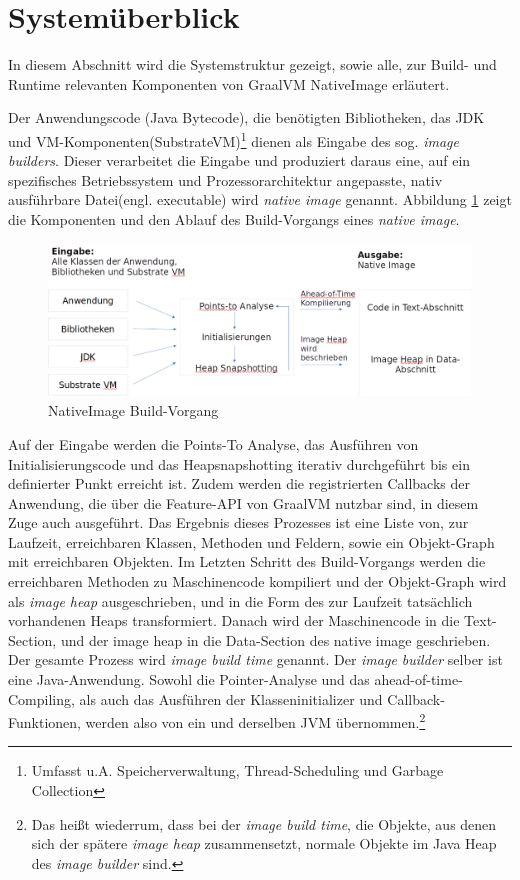 \section{Systemüberblick}
\label{sec:system}
In diesem Abschnitt wird die Systemstruktur gezeigt, sowie alle, zur Build- und Runtime relevanten Komponenten von GraalVM NativeImage erläutert.

Der Anwendungscode (Java Bytecode), die benötigten Bibliotheken, das JDK und VM-Komponenten(SubstrateVM)\footnote{Umfasst u.A. Speicherverwaltung, Thread-Scheduling und Garbage Collection} dienen als Eingabe des sog. \textit{image builders}. Dieser verarbeitet die Eingabe und produziert daraus eine, auf ein spezifisches Betriebssystem und Prozessorarchitektur angepasste, nativ ausführbare Datei(engl. executable) wird \textit{native image} genannt. 
Abbildung \ref{fig:system_buildtime} zeigt die Komponenten und den Ablauf des Build-Vorgangs eines \textit{native image}.

\begin{figure}[ht]
	\centering
	\includegraphics[width=1\textwidth]{resources/GraalVM_BuildTime.png}
	\caption{NativeImage Build-Vorgang}
	\label{fig:system_buildtime}
\end{figure}

Auf der Eingabe werden die Points-To Analyse, das Ausführen von Initialisierungscode und das Heapsnapshotting iterativ durchgeführt bis ein definierter Punkt erreicht ist. 
Zudem werden die registrierten Callbacks der Anwendung, die über die Feature-API von GraalVM nutzbar sind, in diesem Zuge auch ausgeführt. Das Ergebnis dieses Prozesses ist eine Liste von, zur Laufzeit, erreichbaren Klassen, 
Methoden und Feldern, sowie ein Objekt-Graph mit erreichbaren Objekten. Im Letzten Schritt des Build-Vorgangs werden die erreichbaren Methoden zu Maschinencode kompiliert
 und der Objekt-Graph wird als \textit{image heap} ausgeschrieben, und in die Form des zur Laufzeit tatsächlich vorhandenen Heaps transformiert. Danach wird der Maschinencode 
 in die Text-Section, und der image heap in die Data-Section \parencite[Fig. 1-13]{TISC1995} des native image geschrieben. Der gesamte Prozess wird \textit{image build time} genannt\parencite{Wimmer2019}.
Der \textit{image builder} selber ist eine Java-Anwendung. Sowohl die Pointer-Analyse 
und das ahead-of-time-Compiling, als auch das Ausführen der Klasseninitializer und Callback-Funktionen, werden also von ein und derselben JVM
 übernommen.\footnote{Das heißt wiederrum, dass bei der \textit{image build time}, die Objekte, aus denen sich der spätere \textit{image heap} zusammensetzt,
 normale Objekte im Java Heap des \textit{image builder} sind.}
